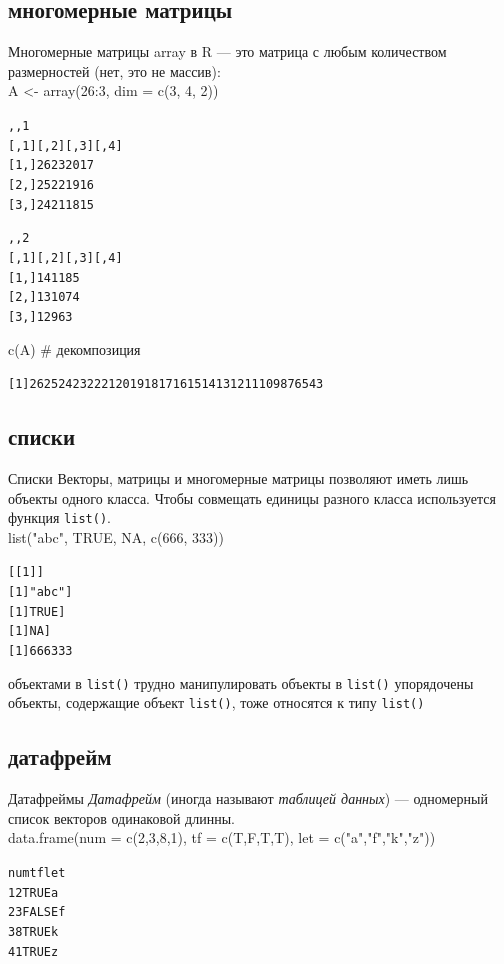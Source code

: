 \subsection{многомерные матрицы}
\begin{frame}[fragile]{Многомерные матрицы}
array в R — это матрица с любым количеством размерностей (нет, это не массив):\\
A <- array(26:3, dim = c(3, 4, 2))
\footnotesize 
\begin{alltt}
, , 1
     [,1] [,2] [,3] [,4]
[1,]   26   23   20   17
[2,]   25   22   19   16
[3,]   24   21   18   15

, , 2
     [,1] [,2] [,3] [,4]
[1,]   14   11    8    5
[2,]   13   10    7    4
[3,]   12    9    6    3
\end{alltt}
\normalsize
c(A) \hfill \# декомпозиция
\footnotesize 
\begin{alltt}
[1] 26 25 24 23 22 21 20 19 18 17 16 15 14 13 12 11 10  9  8  7  6  5  4  3
\end{alltt}
\normalsize
\end{frame}
\subsection{списки}
\begin{frame}[fragile]{Списки}
Векторы, матрицы и многомерные матрицы позволяют иметь лишь объекты одного класса. Чтобы совмещать единицы разного класса используется функция \footnotesize\verb"list()"\normalsize.\\
list("abc"{}, TRUE, NA, c(666, 333))
\footnotesize 
\begin{alltt}
[[1]]
[1] "abc" \medskip
[[2]]
[1] TRUE \medskip
[[3]]
[1] NA \medskip
[[4]]
[1] 666 333
\end{alltt}
\normalsize
\begin{itemize}
\mytem объектами в \footnotesize\verb"list()"\normalsize{} трудно манипулировать
\mytem объекты в \footnotesize\verb"list()"\normalsize{} упорядочены
\mytem объекты, содержащие объект \footnotesize\verb"list()"\normalsize{}, тоже относятся к типу \footnotesize\verb"list()"\normalsize
\end{itemize}
\end{frame}
\subsection{датафрейм}
\begin{frame}[fragile]{Датафреймы}
\textit{Датафрейм} (иногда называют \textit{таблицей данных}) — одномерный список векторов одинаковой длинны.\\
data.frame(num = c(2,3,8,1),
           tf = c(T,F,T,T),
           let = c("a","f","k","z"))
\footnotesize 
\begin{alltt}
  num        tf let
1     2  TRUE   a
2     3 FALSE   f
3     8  TRUE   k
4     1  TRUE   z
\end{alltt}
\normalsize
\end{frame}

